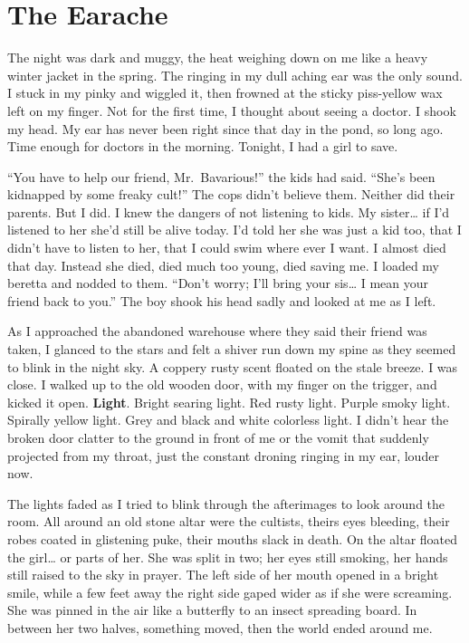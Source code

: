 \chapter{The Earache}



The night was dark and muggy, the heat weighing down on me like a
heavy winter jacket in the spring. The ringing in my dull aching
ear was the only sound. I stuck in my pinky and wiggled it, then
frowned at the sticky piss-yellow wax left on my finger. Not for
the first time, I thought about seeing a doctor. I shook my head.
My ear has never been right since that day in the pond, so long
ago. Time enough for doctors in the morning. Tonight, I had a girl
to save.



``You have to help our friend, Mr.\ Bavarious!'' the kids
had said. ``She's been kidnapped by some freaky
cult!'' The cops didn't believe them. Neither did their
parents. But I did. I knew the dangers of not listening to kids. My
sister{\ldots} if I'd listened to her she'd still be
alive today. I'd told her she was just a kid too, that I
didn't have to listen to her, that I could swim where ever I
want. I almost died that day. Instead she died, died much too
young, died saving me. I loaded my beretta and nodded to them.
``Don't worry; I'll bring your sis{\ldots} I mean
your friend back to you.'' The boy shook his head sadly and
looked at me as I left.



As I approached the abandoned warehouse where they said their
friend was taken, I glanced to the stars and felt a shiver run down
my spine as they seemed to blink in the night sky. A coppery rusty
scent floated on the stale breeze. I was close. I walked up to the
old wooden door, with my finger on the trigger, and kicked it open.
{\bf Light}. Bright searing light. Red rusty light. Purple smoky light.
Spirally yellow light. Grey and black and white colorless light. I
didn't hear the broken door clatter to the ground in front of
me or the vomit that suddenly projected from my throat, just the
constant droning ringing in my ear, louder now.



The lights faded as I tried to blink through the afterimages to
look around the room. All around an old stone altar were the
cultists, theirs eyes bleeding, their robes coated in glistening
puke, their mouths slack in death. On the altar floated the
girl{\ldots} or parts of her. She was split in two; her eyes still
smoking, her hands still raised to the sky in prayer. The left side
of her mouth opened in a bright smile, while a few feet away the
right side gaped wider as if she were screaming. She was pinned in
the air like a butterfly to an insect spreading board. In between
her two halves, something moved, then the world ended around
me.



